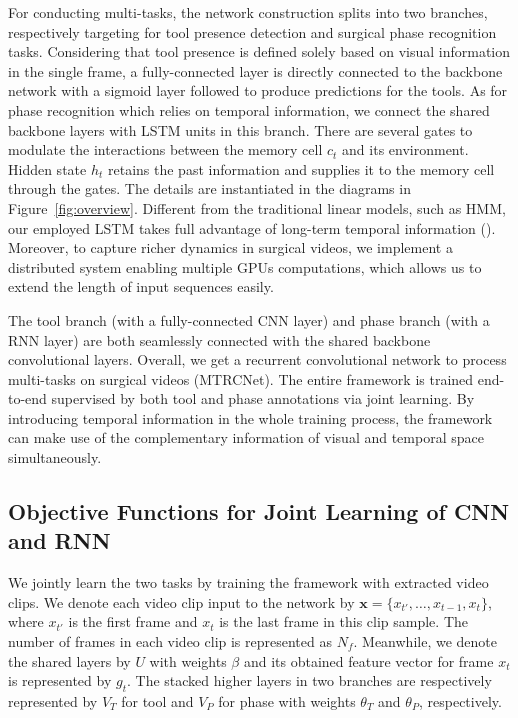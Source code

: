 \documentclass{elsarticle}
\begin{document}
For conducting multi-tasks, the network construction splits into two branches, respectively targeting for tool presence detection and surgical phase recognition tasks.
Considering that tool presence is defined solely based on visual information in the single frame, a fully-connected layer is directly connected to the backbone network with a sigmoid layer followed to produce predictions for the tools.
As for phase recognition which relies on temporal information, we connect the shared backbone layers with LSTM units in this branch.
There are several gates to modulate the interactions between the memory cell $c_t$ and its environment.
Hidden state $h_t$ retains the past information and supplies it to the memory cell through the gates.
The details are instantiated in the diagrams in Figure~\ref{fig:overview}. 
Different from the traditional linear models, such as HMM, our employed LSTM takes full advantage of long-term temporal information (\cite{donahue2015long}).
Moreover, to capture richer dynamics in surgical videos, we implement a distributed system enabling multiple GPUs computations, which allows us to extend the length of input sequences easily.

The tool branch (with a fully-connected CNN layer) and phase branch (with a RNN layer) are both seamlessly connected with the shared backbone convolutional layers.
Overall, we get a recurrent convolutional network to process multi-tasks on surgical videos (MTRCNet).
The entire framework is trained end-to-end supervised by both tool and phase annotations via joint learning.
By introducing temporal information in the whole training process, the framework can make use of the complementary information of visual and temporal space simultaneously.



\subsection{Objective Functions for Joint Learning of CNN and RNN}
We jointly learn the two tasks by training the framework with extracted video clips.
We denote each video clip input to the network by $\bm{x} \! = \! \{ x_{t'}, \ldots, x_{t-1}, x_t \}$, where $x_{t'}$ is the first frame and $x_t$ is the last frame in this clip sample. 
The number of frames in each video clip is represented as $N_f$. 
Meanwhile, we denote the shared layers by $U$ with weights $\beta$ and its obtained feature vector for frame $x_t$ is represented by $g_t$.
The stacked higher layers in two branches are respectively represented by $V_T$ for tool and $V_P$ for phase with weights $\theta_T$ and $\theta_P$, respectively.
\end{document}
